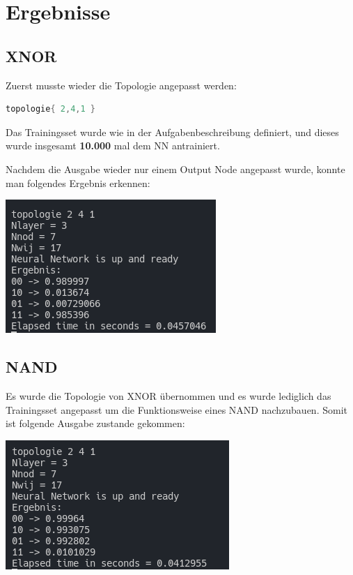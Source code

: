 
\section{Ergebnisse}
\label{sec:Ergebnisse}
\subsection{XNOR}
Zuerst musste wieder die Topologie angepasst werden:

\begin{lstlisting}[language=c]
	topologie{ 2,4,1 }
\end{lstlisting}

Das Trainingsset wurde wie in der Aufgabenbeschreibung definiert, und dieses wurde insgesamt \textbf{10.000} mal dem NN antrainiert. 

Nachdem die Ausgabe wieder nur einem Output Node angepasst wurde, konnte man folgendes Ergebnis erkennen:

\begin{minipage}{\linewidth}
	\centering
	\includegraphics[width=0.6\linewidth]{images/1}
\end{minipage}

\subsection{NAND}
Es wurde die Topologie von XNOR übernommen und es wurde lediglich das Trainingsset angepasst um die Funktionsweise eines NAND nachzubauen. Somit ist folgende Ausgabe zustande gekommen:

\begin{minipage}{\linewidth}
	\centering
	\includegraphics[width=0.6\linewidth]{images/2}
\end{minipage}

